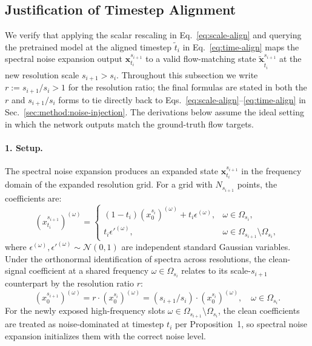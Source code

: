 \subsection{Justification of Timestep Alignment}
\label{app:time-align}

We verify that applying the scalar rescaling in Eq.~\eqref{eq:scale-align} and querying the pretrained model at the aligned timestep $\tilde{t}_i$ in Eq.~\eqref{eq:time-align} maps the spectral noise expansion output $\mathbf{x}^{s_{i+1}}_{t_i}$ to a valid flow-matching state $\tilde{\mathbf{x}}^{s_{i+1}}_{\tilde{t}_i}$ at the new resolution scale $s_{i+1} > s_i$. Throughout this subsection we write $r := s_{i+1}/s_i > 1$ for the resolution ratio; the final formulas are stated in both the $r$ and $s_{i+1}/s_i$ forms to tie directly back to Eqs.~\eqref{eq:scale-align}--\eqref{eq:time-align} in Sec.~\ref{sec:method:noise-injection}. The derivations below assume the ideal setting in which the network outputs match the ground-truth flow targets.

\paragraph{1. Setup.}
The spectral noise expansion produces an expanded state $\mathbf{x}^{s_{i+1}}_{t_i}$ in the frequency domain of the expanded resolution grid. For a grid with $N_{s_{i+1}}$ points, the coefficients are:
$$
\left(x^{s_{i+1}}_{t_i}\right)^{(\omega)} =
\begin{cases}
(1-t_i)\left(x_{0}^{s_i}\right)^{(\omega)} + t_i\epsilon^{(\omega)}, & \omega \in \Omega_{s_i}, \\[2pt]
t_i\epsilon'^{(\omega)}, & \omega \in \Omega_{s_{i+1}} \setminus \Omega_{s_i},
\end{cases}
$$
where $\epsilon^{(\omega)}, \epsilon'^{(\omega)} \sim \mathcal{N}(0, 1)$ are independent standard Gaussian variables. Under the orthonormal identification of spectra across resolutions, the clean-signal coefficient at a shared frequency $\omega \in \Omega_{s_i}$ relates to its scale-$s_{i+1}$ counterpart by the resolution ratio $r$:
$$
\left(x_{0}^{s_{i+1}}\right)^{(\omega)} = r \cdot \left(x_{0}^{s_i}\right)^{(\omega)} = (s_{i+1}/s_i) \cdot \left(x_{0}^{s_i}\right)^{(\omega)}, \quad \omega \in \Omega_{s_i}.
$$
For the newly exposed high-frequency slots $\omega \in \Omega_{s_{i+1}} \setminus \Omega_{s_i}$, the clean coefficients are treated as noise-dominated at timestep $t_i$ per Proposition~1, so spectral noise expansion initializes them with the correct noise level.

